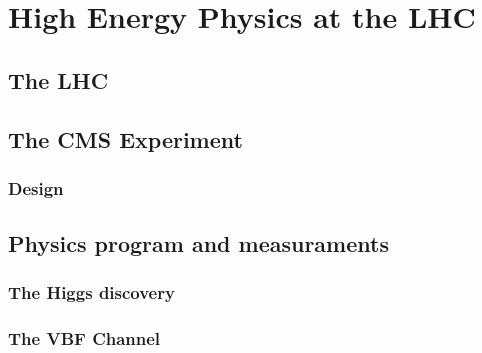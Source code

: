 \chapter{High Energy Physics at the LHC}\label{ch:plhc} %

\section{The LHC}

\section{The CMS Experiment}

\subsection{Design}

\section{Physics program and measuraments}

\subsection{The Higgs discovery}

\subsection{The VBF Channel}
